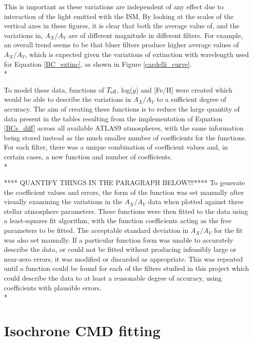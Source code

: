 \documentclass[12pt, a4paper]{report}
\begin{document}
This is important as these variations are independent of any effect due to interaction of the light emitted with the ISM. By looking at the scales of the vertical axes in these figures, it is clear that both the average value of, and the variations in, $A_{X}/A_{V}$ are of different magnitude in different filters. For example, an overall trend seems to be that bluer filters produce higher average values of $A_{X}/A_{V}$, which is expected given the variations of extinction with wavelength used for Equation \ref{BC_extinc}, as shown in Figure \ref{cardelli_curve}. \\*



To model these data, functions of $T_{\textnormal{eff}}$, log($g$) and [Fe/H] were created which would be able to describe the variations in $A_{X}/A_{V}$ to a sufficient degree of accuracy. The aim of creating these functions is to reduce the large quantity of data present in the tables resulting from the implementation of Equation \ref{BCs_diff} across all available ATLAS9 atmospheres, with the same information being stored instead as the much smaller number of coefficients for the functions. For each filter, there was a unique combination of coefficient values and, in certain cases, a new function and number of coefficients.\\*

**** QUANTIFY THINGS IN THE PARAGRAPH BELOW!!!****
To generate the coefficient values and errors, the form of the function was set manually after visually examining the variations in the $A_{X}/A_{V}$ data when plotted against three stellar atmosphere parameters. These functions were then fitted to the data using a least-squares fit algorithm, with the function coefficients acting as the free parameters to be fitted. The acceptable standard deviation in $A_{X}/A_{V}$ for the fit was also set manually. If a particular function form was unable to accurately describe the data, or could not be fitted without producing infeasibly large or near-zero errors, it was modified or discarded as appropriate. This was repeated until a function could be found for each of the filters studied in this project which could  describe the data to at least a reasonable degree of accuracy, using coefficients with plausible errors.\\*

\section{Isochrone CMD fitting} \label{isoc_fit} 
\end{document}

